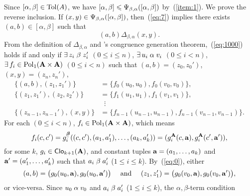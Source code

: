   Since $[\alpha, \beta] \in \operatorname{Tol}(A)$,
  we have $[\alpha, \beta] \leqslant \Psi_{\beta, \alpha}([\alpha, \beta])$
  by~(\ref{item:1}).
  We prove the reverse inclusion.
  If $(x,y)\in \Psi_{\beta, \alpha}([\alpha, \beta])$, then~(\ref{eq:7})
  implies there exists $(a,b)\in [\alpha, \beta]$ such that
    \begin{equation}
      \label{eq:1000}
     (a,b) \mathrel{\Delta_{\beta, \alpha}} (x,y).
    \end{equation}
    From the definition of $\Delta_{\beta, \alpha}$ and 
    \malcev's congruence generation theorem,~(\ref{eq:1000})
    holds if and only if
    $\exists \, z_i \mathrel{\beta} z_i'$ $(0\leq i \leq n)$,
    $\exists \, u_i \mathrel{\alpha} v_i$ $(0\leq i < n)$,
    $\exists\, f_i \in \operatorname{Pol}_1(\mathbf{A}\times \mathbf{A})$ $(0\leq i < n)$
    such that
    $(a, b) = (z_0,z_0')$,
    $(x, y)=(z_n,z_n')$,
    \begin{align}
      \label{eq:0}
      \{(a, b),(z_1,z_1')\} &= \{f_0(u_0,u_0), f_0(v_0,v_0)\},\\
      \label{eq:1}
      \{(z_1,z_1'),(z_2,z_2')\} &= \{f_1(u_1,u_1), f_1(v_1,v_1)\},\\
      \nonumber
      &\; \; \vdots\\
      \nonumber
      \{(z_{n-1},z_{n-1}'),(x, y)\} &= \{f_{n-1}(u_{n-1},u_{n-1}), f_{n-1}(v_{n-1},v_{n-1})\}.
    \end{align}
    For each $(0\leq i < n)$, $f_i \in \operatorname{Pol}_1(\mathbf{A}\times \mathbf{A})$, which means
    \newcommand\gA{\ensuremath{g^{\bA}}}%
    \[      f_i(c, c') = g_i^{\bbeta}((c, c'), (a_1, a_1'), \dots, (a_k, a_k') )
      = (g_i^{\bA}(c, \ba), g_i^{\bA}(c', \ba')),%
      \]%
    \renewcommand\gA{\ensuremath{g}}%
    for some $k$, $\gA_i \in \sansClo_{k+1}(\bA)$, and constant tuples
    $\mathbf{a} = (a_1, \dots, a_k)$ and $\mathbf{a}' = (a_1', \dots, a_k')$ such that
    $a_i \mathrel{\beta} a_i'$ ($1\leq i\leq k$). 
    By~(\ref{eq:0}), either
    \[
    (a, b) = \bigl(\gA_0(u_0, \ba), \gA_0(u_0, \ba')\bigr)
    \quad \text{ and } \quad 
    (z_1,z_1')= \bigl(\gA_0(v_0, \ba), \gA_0(v_0, \ba')\bigr),
    \]
    or vice-versa.  Since $u_0 \mathrel{\alpha} v_0$ and 
    $a_i \mathrel{\beta} a_i'$ ($1\leq i\leq k$), the $\alpha,\beta$-term condition
